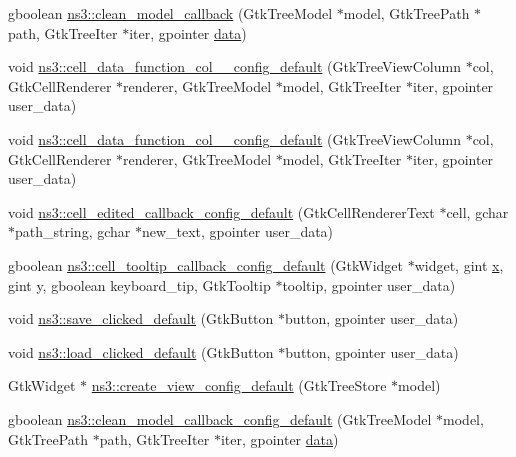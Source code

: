 \begin{DoxyCompactItemize}
\item 
gboolean \hyperlink{namespacens3_a12e280cbcb12ad1955d5ee0cca1cff47}{ns3\+::clean\+\_\+model\+\_\+callback} (Gtk\+Tree\+Model $\ast$model, Gtk\+Tree\+Path $\ast$path, Gtk\+Tree\+Iter $\ast$iter, gpointer \hyperlink{topology-example-sim_8cc_a26c65296e316af77b787dc77469bb2a4}{data})
\item 
void \hyperlink{namespacens3_a05481812e836368172135641dbada4b8}{ns3\+::cell\+\_\+data\+\_\+function\+\_\+col\+\_\+\_\+config\+\_\+default} (Gtk\+Tree\+View\+Column $\ast$col, Gtk\+Cell\+Renderer $\ast$renderer, Gtk\+Tree\+Model $\ast$model, Gtk\+Tree\+Iter $\ast$iter, gpointer user\+\_\+data)
\item 
void \hyperlink{namespacens3_a18dc38f97b2252c3e10d44f9dbbe366b}{ns3\+::cell\+\_\+data\+\_\+function\+\_\+col\+\_\+\_\+config\+\_\+default} (Gtk\+Tree\+View\+Column $\ast$col, Gtk\+Cell\+Renderer $\ast$renderer, Gtk\+Tree\+Model $\ast$model, Gtk\+Tree\+Iter $\ast$iter, gpointer user\+\_\+data)
\item 
void \hyperlink{namespacens3_ac95d50f779140a767284d124cfea71eb}{ns3\+::cell\+\_\+edited\+\_\+callback\+\_\+config\+\_\+default} (Gtk\+Cell\+Renderer\+Text $\ast$cell, gchar $\ast$path\+\_\+string, gchar $\ast$new\+\_\+text, gpointer user\+\_\+data)
\item 
gboolean \hyperlink{namespacens3_a614e487215e562d0b6ac0b3b3f443f20}{ns3\+::cell\+\_\+tooltip\+\_\+callback\+\_\+config\+\_\+default} (Gtk\+Widget $\ast$widget, gint \hyperlink{lte__link__budget__x2__handover__measures_8m_a9336ebf25087d91c818ee6e9ec29f8c1}{x}, gint y, gboolean keyboard\+\_\+tip, Gtk\+Tooltip $\ast$tooltip, gpointer user\+\_\+data)
\item 
void \hyperlink{namespacens3_ae70b84ab7090f1eaa73e7209be9400d2}{ns3\+::save\+\_\+clicked\+\_\+default} (Gtk\+Button $\ast$button, gpointer user\+\_\+data)
\item 
void \hyperlink{namespacens3_af500ab6459ed7099c0e403a504f9339e}{ns3\+::load\+\_\+clicked\+\_\+default} (Gtk\+Button $\ast$button, gpointer user\+\_\+data)
\item 
Gtk\+Widget $\ast$ \hyperlink{namespacens3_a9b0de38431169a0ec08415d6f1a2fa67}{ns3\+::create\+\_\+view\+\_\+config\+\_\+default} (Gtk\+Tree\+Store $\ast$model)
\item 
gboolean \hyperlink{namespacens3_a9c65740963efd473d9039ae16aa3a408}{ns3\+::clean\+\_\+model\+\_\+callback\+\_\+config\+\_\+default} (Gtk\+Tree\+Model $\ast$model, Gtk\+Tree\+Path $\ast$path, Gtk\+Tree\+Iter $\ast$iter, gpointer \hyperlink{topology-example-sim_8cc_a26c65296e316af77b787dc77469bb2a4}{data})
\end{DoxyCompactItemize}
